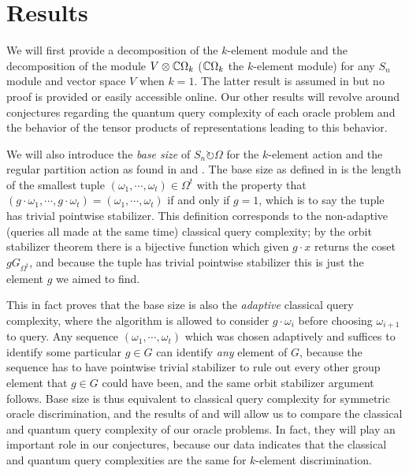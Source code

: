 \documentclass[12pt,twoside]{reedthesis}
\theoremstyle{plain}   %
\theoremstyle{definition}
\theoremstyle{remark}
\numberwithin{equation}{section}
\def\acts{\circlearrowright} %
\begin{document}
  \chapter{Results}
  We will first provide a decomposition of the $k$-element module and the decomposition of the module $V \otimes \mathbb{C} \Omega_k$ ($\mathbb{C} \Omega_k$ the $k$-element module) for any $S_n$ module and vector space $V$ when $k=1$.
  The latter result is assumed in \cite{copeland} but no proof is provided or easily accessible online.
  Our other results will revolve around conjectures regarding the quantum query complexity of each oracle problem and the behavior of the tensor products of representations leading to this behavior.
  \par
  We will also introduce the \emph{base size} of $S_n \acts \Omega$ for the $k$-element action and the regular partition action as found in \cite{spiga23} and \cite{spiga24}.
  The base size as defined in \cite{copeland} is the length of the smallest tuple $(\omega_1, \cdots, \omega_t) \in \Omega^t$ with the property that $(g\cdot \omega_1, \cdots, g\cdot \omega_t) = (\omega_1, \cdots, \omega_t)$
  if and only if $g=1$, which is to say the tuple has trivial pointwise stabilizer.
  This definition corresponds to the non-adaptive (queries all made at the same time) classical query complexity; by the orbit stabilizer theorem there is a bijective function
  which given $g \cdot x$ returns the coset $gG_{\Omega^t}$, and because the tuple has trivial pointwise stabilizer this is just the element $g$ we aimed to find. \par
  This in fact proves that the base size is also the \emph{adaptive} classical query complexity, where the algorithm is allowed to consider $g \cdot \omega_i$ before choosing $\omega_{i+1}$ to query.
  Any sequence $(\omega_1, \cdots, \omega_t)$ which was chosen adaptively and suffices to identify some particular $g \in G$ can identify \emph{any} element of $G$, because the sequence has to have pointwise
  trivial stabilizer to rule out every other group element that $g \in G$ could have been, and the same orbit stabilizer argument follows. Base size is thus equivalent to classical query complexity for symmetric oracle discrimination,
  and the results of \cite{spiga23} and \cite{spiga24} will allow us to compare the classical and quantum query complexity of our oracle problems.
  In fact, they will play an important role in our conjectures, because our data indicates that the classical and quantum query complexities are the same for $k$-element discrimination.
\end{document}
